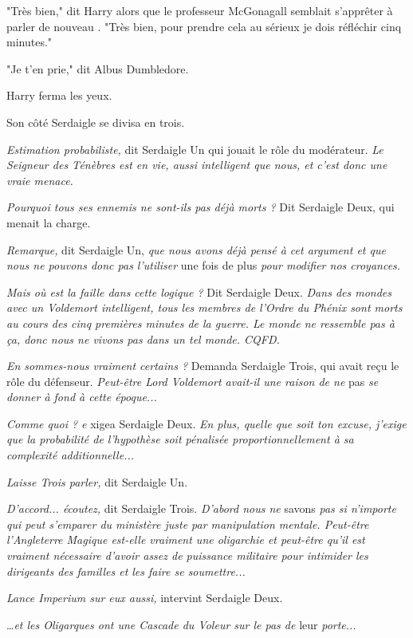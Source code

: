 "Très bien," dit Harry alors que le professeur McGonagall semblait s'apprêter à parler de nouveau . "Très bien, pour prendre cela au sérieux je dois réfléchir cinq minutes."

"Je t'en prie," dit Albus Dumbledore.

Harry ferma les yeux.

Son côté Serdaigle se divisa en trois.

\emph{Estimation probabiliste, } dit Serdaigle Un qui jouait le rôle du modérateur. \emph{Le Seigneur des Ténèbres est en vie, aussi intelligent que nous, et c'est donc une vraie menace.} 

\emph{Pourquoi tous ses ennemis ne sont-ils pas déjà morts ? } Dit Serdaigle Deux, qui menait la charge.

\emph{Remarque, } dit Serdaigle Un, \emph{que nous avons déjà pensé à cet argument et que nous ne pouvons donc pas l'utiliser } une fois de plus \emph{pour modifier nos croyances.} 

\emph{Mais où est la faille dans cette logique ? } Dit Serdaigle Deux. \emph{Dans des mondes avec un Voldemort intelligent, tous les membres de l'Ordre du Phénix sont morts au cours des cinq premières minutes de la guerre. Le monde ne ressemble pas à ça, donc nous ne vivons pas dans un tel monde. CQFD.} 

\emph{En sommes-nous vraiment certains ? } Demanda Serdaigle Trois, qui avait reçu le rôle du défenseur. \emph{Peut-être Lord Voldemort avait-il une raison de ne } pas \emph{se donner à fond à cette époque...} 

\emph{Comme quoi ? e} xigea Serdaigle Deux. \emph{En plus, quelle que soit ton excuse, j'exige que la probabilité de l'hypothèse soit pénalisée proportionnellement à sa complexité additionnelle...} 

\emph{Laisse Trois parler, } dit Serdaigle Un.

\emph{D'accord... écoutez, } dit Serdaigle Trois. \emph{D'abord nous ne } savons \emph{pas si n'importe qui peut s'emparer du ministère juste par manipulation mentale. Peut-être l'Angleterre Magique est-elle vraiment une oligarchie et peut-être qu'il est vraiment nécessaire d'avoir assez de puissance militaire pour intimider les dirigeants des familles et les faire se soumettre...} 

\emph{Lance Imperium sur eux aussi, } intervint Serdaigle Deux.

…\emph{et les Oligarques ont une Cascade du Voleur sur le pas de } leur \emph{porte...} 


